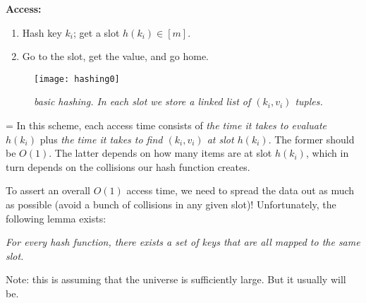 \documentclass[11pt]{article}
\begin{document}
\textbf{Access:}
\begin{enumerate}
\item Hash key $k_i$; get a slot $h(k_i) \in [m]$.
\item Go to the slot, get the value, and go home.
\end{enumerate}

\newpage

\begin{figure}[h]
\centering
\texttt{[image: hashing0]}
\caption{\textit{basic hashing. In each slot we store a linked list of $(k_i, v_i)$ tuples.}}
\end{figure}

{\parskip=\baselineskip
In this scheme, each access time consists of \textit{the time it takes to evaluate $h(k_i)$} plus \textit{the time it takes to find $(k_i, v_i)$ at slot $h(k_i)$}. The former should be $O(1)$. The latter depends on how many items are at slot $h(k_i)$, which in turn depends on the collisions our hash function creates.

To assert an overall $O(1)$ access time, we need to spread the data out as much as possible (avoid a bunch of collisions in any given slot)! Unfortunately, the following lemma exists:
}

\begin{flushright}
\textit{For every hash function, there exists a set of keys that are all mapped to the same slot.}
\end{flushright}

Note: this is assuming that the universe is sufficiently large. But it usually will be.
\end{document}
